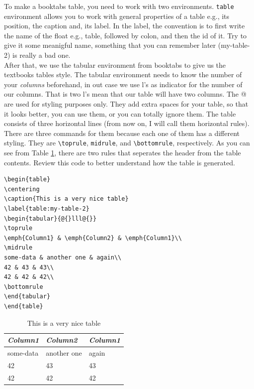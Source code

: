 \documentclass[paper=a4, fontsize=11pt]{scrartcl} %
\numberwithin{equation}{section} %
\numberwithin{figure}{section} %
\numberwithin{table}{section} %
\begin{document}
To make a booktabs table, you need to work with two environments. \verb|table| environment allows you to work with general properties of a table e.g., its position, the caption and, its label. In the label, the convention is to first write the name of the float e.g., table, followed by colon, and then the id of it. Try to give it some meanigful name, something that you can remember later (my-table-2) is really a bad one.\\
After that, we use the tabular environment from booktabs to give us the textbooks tables style. The tabular environment needs to know the number of your \textit{columns} beforehand, in out case we use l's as indicator for the number of our columns. That is two l's mean that our table will have two columns. The @{} are used for styling purposes only. They add extra spaces for your table, so that it looks better, you can use them, or you can totally ignore them. The table consists of three horizontal lines (from now on, I will call them horizontal rules). There are three commands for them because each one of them has a different styling. They are \verb|\toprule|, \verb|midrule|, and \verb|\bottomrule|, respectively. As you can see from Table \ref{table:my-table-2}, there are two rules that seperates the header from the table contents. Review this code to better understand how the table is generated.

\begin{verbatim}
\begin{table}
\centering
\caption{This is a very nice table}
\label{table:my-table-2}
\begin{tabular}{@{}lll@{}}
\toprule
\emph{Column1} & \emph{Column2} & \emph{Column1}\\
\midrule
some-data & another one & again\\
42 & 43 & 43\\
42 & 42 & 42\\
\bottomrule
\end{tabular}
\end{table}
\end{verbatim}

\begin{table}
	\centering
	\caption{This is a very nice table}
	\label{table:my-table-2}
	\begin{tabular}{@{}lll@{}}
		\toprule
		\emph{Column1} & \emph{Column2} & \emph{Column1}\\
		\midrule
		some-data & another one & again\\
		42 & 43 & 43\\
		42 & 42 & 42\\
		\bottomrule
	\end{tabular}
\end{table}
\end{document}
